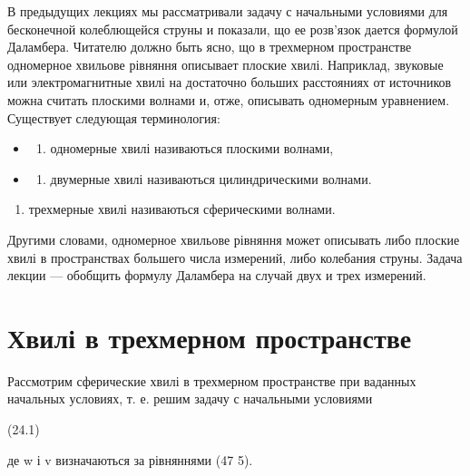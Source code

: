 \documentclass[
  ukrainian,
]{article}
\providecommand{\tightlist}{%
  \setlength{\itemsep}{0pt}\setlength{\parskip}{0pt}}
\begin{document}
В предыдущих лекциях мы рассматривали задачу с начальными условиями для
бесконечной колеблющейся струны и показали, що ее розв'язок дается
формулой Даламбера. Читателю должно быть ясно, що в трехмерном
пространстве одномерное хвильове рівняння описывает плоские хвилі.
Наприклад, звуковые или электромагнитные хвилі на достаточно больших
расстояниях от источников можна считать плоскими волнами и, отже,
описывать одномерным уравнением. Существует следующая терминология:

\begin{itemize}
\tightlist
\item
  \begin{enumerate}
  \def\labelenumi{\arabic{enumi})}
  \tightlist
  \item
    одномерные хвилі називаються плоскими волнами,
  \end{enumerate}
\item
  \begin{enumerate}
  \def\labelenumi{\arabic{enumi})}
  \setcounter{enumi}{1}
  \tightlist
  \item
    двумерные хвилі називаються цилиндрическими волнами.
  \end{enumerate}
\end{itemize}

\begin{enumerate}
\def\labelenumi{\arabic{enumi})}
\setcounter{enumi}{2}
\tightlist
\item
  трехмерные хвилі називаються сферическими волнами.
\end{enumerate}

Другими словами, одномерное хвильове рівняння может описывать либо
плоские хвилі в пространствах большего числа измерений, либо колебания
струны. Задача лекции --- обобщить формулу Даламбера на случай двух и
трех измерений.

\section{Хвилі в трехмерном
пространстве}\label{ux445ux432ux438ux43bux456-ux432-ux442ux440ux435ux445ux43cux435ux440ux43dux43eux43c-ux43fux440ux43eux441ux442ux440ux430ux43dux441ux442ux432ux435}

Рассмотрим сферические хвилі в трехмерном пространстве при ваданных
начальных условиях, т. е. решим задачу с начальными условиями

(24.1)

де w і v визначаються за рівняннями (47 5).
\end{document}
